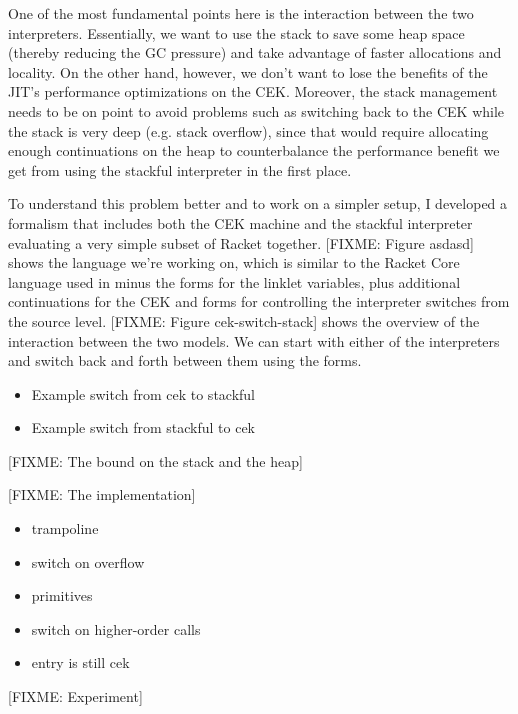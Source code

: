 One of the most fundamental points here is the interaction between the
two interpreters. Essentially, we want to use the stack to save some
heap space (thereby reducing the GC pressure) and take advantage of
faster allocations and locality. On the other hand, however, we don't
want to lose the benefits of the JIT's performance optimizations on
the CEK. Moreover, the stack management needs to be on point to avoid
problems such as switching back to the CEK while the stack is very
deep (e.g. stack overflow), since that would require allocating enough
continuations on the heap to counterbalance the performance benefit we
get from using the stackful interpreter in the first place.

To understand this problem better and to work on a simpler setup, I
developed a formalism that includes both the CEK machine and the
stackful interpreter evaluating a very simple subset of Racket
together. [FIXME: Figure asdasd] shows the language we're working on, which
is similar to the Racket Core language used in
 minus the forms for the linklet
variables, plus additional continuations for the CEK and
 forms for controlling the interpreter switches
from the source level. [FIXME: Figure cek-switch-stack] shows the overview of
the interaction between the two models. We can start with either of
the interpreters and switch back and forth between them using the
 forms.

\begin{itemize}
\item Example switch from cek to stackful
\item Example switch from stackful to cek
\end{itemize}

[FIXME: The bound on the stack and the heap]

[FIXME: The implementation]

\begin{itemize}
\item trampoline
\item switch on overflow
\item primitives
\item switch on higher-order calls
\item entry is still cek
\end{itemize}

[FIXME: Experiment]


